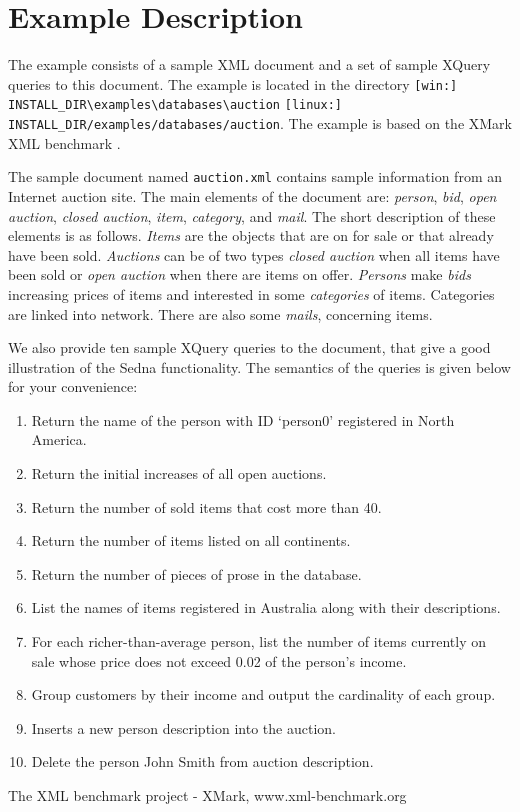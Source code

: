 \documentclass[a4paper,12pt]{article}
\begin{document}
\section{Example Description}
\label{sec:example-description}
The example consists of a sample XML document and a set of sample XQuery queries to this document. The example is located in the directory \verb![win:] INSTALL_DIR\examples\databases\auction! \verb![linux:] INSTALL_DIR/examples/databases/auction!. The example is based on the XMark XML benchmark \cite{xmark}.

The sample document named \verb!auction.xml! contains sample information from an Internet auction site. The main elements of the document are: \emph{person}, \emph{bid}, \emph{open auction}, \emph{closed auction}, \emph{item}, \emph{category}, and \emph{mail}. The short description of these elements is as follows. \emph{Items} are the objects that are on for sale or that already have been sold. \emph{Auctions} can be of two types \emph{closed auction} when all items have been sold or \emph{open auction} when there are items on offer. \emph{Persons} make \emph{bids} increasing prices of items and interested in some \emph{categories} of items. Categories are linked into network. There are also some \emph{mails}, concerning items. 

We also provide ten sample XQuery queries to the document, that give a good illustration of the Sedna functionality. The semantics of the queries is given below for your convenience:
\begin{enumerate}
\item Return the name of the person with ID `person0' registered in North
 America.
\item Return the initial increases of all open auctions.
\item Return the number of sold items that cost more than 40.
\item Return the number of items listed on all continents.
\item Return the number of pieces of prose in the database.
\item List the names of items registered in Australia along with their
 descriptions.
\item For each richer-than-average person, list the number of items currently
 on sale whose price does not exceed 0.02 of the person's income.
\item Group customers by their income and output the cardinality of each group.
\item Inserts a new person description into the auction.
\item Delete the person John Smith from auction description.
\end{enumerate}

\begin{thebibliography}{9}
 The XML benchmark project - XMark, www.xml-benchmark.org
\end{thebibliography}
\end{document}
